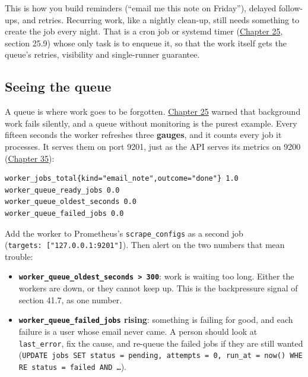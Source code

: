 \noindent{}This is how you build reminders (``email me this note on Friday''), delayed follow-ups, and retries. Recurring work, like a nightly clean-up, still needs something to create the job every night. That is a cron job or systemd timer (\hyperref[ch:25-process-management]{Chapter 25}, section 25.9) whose only task is to enqueue it, so that the work itself gets the queue's retries, visibility and single-runner guarantee.

\subsection*{Seeing the queue}\label{41-event-driven-architecture:seeing-the-queue}

A queue is where work goes to be forgotten. \hyperref[ch:25-process-management]{Chapter 25} warned that background work fails silently, and a queue without monitoring is the purest example. Every fifteen seconds the worker refreshes three \textbf{gauges}, and it counts every job it processes. It serves them on port 9201, just as the API serves its metrics on 9200 (\hyperref[ch:35-observability]{Chapter 35}):

\begin{outputbox}[short]
\begin{Verbatim}[fontsize=\codesize, breaklines, breakanywhere, breaksymbolleft={\tiny\textcolor{muted}{$\hookrightarrow$}}]
worker_jobs_total{kind="email_note",outcome="done"} 1.0
worker_queue_ready_jobs 0.0
worker_queue_oldest_seconds 0.0
worker_queue_failed_jobs 0.0
\end{Verbatim}
\end{outputbox}

\noindent{}Add the worker to Prometheus's \texttt{scrape\_configs} as a second job (\texttt{targets:}\allowbreak{}\texttt{\ {[}"127.}\allowbreak{}\texttt{0.}\allowbreak{}\texttt{0.}\allowbreak{}\texttt{1:}\allowbreak{}\texttt{9201"{]}}). Then alert on the two numbers that mean trouble:

\begin{itemize}
\tightlist
\item
  \textbf{\texttt{worker\_}\allowbreak{}\texttt{queue\_}\allowbreak{}\texttt{oldest\_}\allowbreak{}\texttt{seconds\ \textgreater{}\ 300}}: work is waiting too long. Either the workers are down, or they cannot keep up. This is the backpressure signal of section 41.7, as one number.
\item
  \textbf{\texttt{worker\_}\allowbreak{}\texttt{queue\_}\allowbreak{}\texttt{failed\_}\allowbreak{}\texttt{jobs} rising}: something is failing for good, and each failure is a user whose email never came. A person should look at \texttt{last\_error}, fix the cause, and re-queue the failed jobs if they are still wanted (\texttt{UPDATE\ jobs\ SET\ status\ =}\allowbreak{}\texttt{\ \textquotesingle{}pending\textquotesingle{},}\allowbreak{}\texttt{\ attempts\ =}\allowbreak{}\texttt{\ 0,}\allowbreak{}\texttt{\ run\_}\allowbreak{}\texttt{at\ =}\allowbreak{}\texttt{\ now()\ WHERE\ status\ =}\allowbreak{}\texttt{\ \textquotesingle{}failed\textquotesingle{}\ AND\ …}).
\end{itemize}

